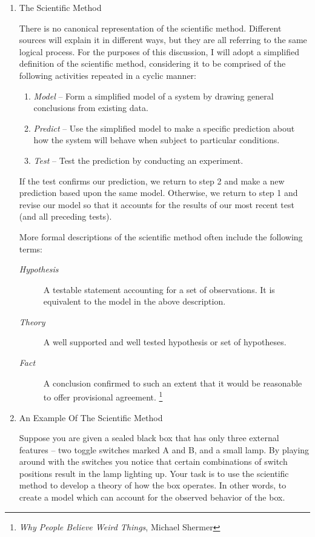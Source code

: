\documentclass{article}
\begin{document}
\begin{enumerate}
\item The Scientific Method
\label{sec:orgheadline387}

There is no canonical representation of the scientific method. Different
sources will explain it in different ways, but they are all referring to
the same logical process. For the purposes of this discussion, I will
adopt a simplified definition of the scientific method, considering it
to be comprised of the following activities repeated in a cyclic manner:

\begin{enumerate}
\item \emph{Model} -- Form a simplified model of a system by drawing general
conclusions from existing data.\\
\item \emph{Predict} -- Use the simplified model to make a specific prediction
about how the system will behave when subject to particular
conditions.\\
\item \emph{Test} -- Test the prediction by conducting an experiment.
\end{enumerate}

If the test confirms our prediction, we return to step 2 and make a new
prediction based upon the same model. Otherwise, we return to step 1 and
revise our model so that it accounts for the results of our most recent
test (and all preceding tests).

More formal descriptions of the scientific method often include the
following terms:

\begin{description}
\item[{\emph{Hypothesis}}] A testable statement accounting for a set of
observations. It is equivalent to the model in the above description.
\item[{\emph{Theory}}] A well supported and well tested hypothesis or set of
hypotheses.
\item[{\emph{Fact}}] A conclusion confirmed to such an extent that it would be
reasonable to offer provisional agreement. \footnote{\emph{Why People Believe Weird Things}, Michael Shermer}
\end{description}

\item An Example Of The Scientific Method
\label{sec:orgheadline392}

Suppose you are given a sealed black box that has only three external
features -- two toggle switches marked A and B, and a small lamp. By
playing around with the switches you notice that certain combinations of
switch positions result in the lamp lighting up. Your task is to use the
scientific method to develop a theory of how the box operates. In other
words, to create a model which can account for the observed behavior of
the box.


\end{enumerate}
\end{document}
